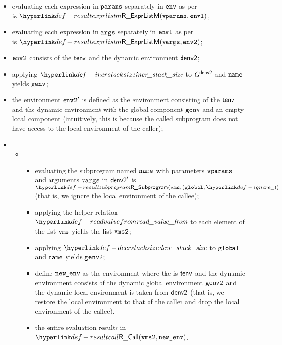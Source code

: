 \ProseParagraph
\AllApply
\begin{itemize}
  \item evaluating each expression in $\texttt{params}$ separately in $\texttt{env}$ as per\\
         is $\ResultExprListM(\vvparams, \envone)$\ProseOrAbnormal;
  \item evaluating each expression in $\texttt{args}$ separately in $\texttt{env1}$ as per \\
         is $\ResultExprListM(\vvargs, \envtwo)$\ProseOrAbnormal;
  \item $\texttt{env2}$ consists of the \staticenvironmentterm{} $\textsf{tenv}$ and the dynamic environment $\textsf{denv2}$;
  \item applying $\incrstacksize$ to $G^{\textsf{denv2}}$ and $\texttt{name}$ yields $\texttt{genv}$;
  \item the environment $\texttt{env2}'$ is defined as the environment
  consisting of the \staticenvironmentterm{} $\textsf{tenv}$ and the dynamic environment with the global component
  $\texttt{genv}$ and an empty local component (intuitively, this is because the called subprogram does not have access
  to the local environment of the caller);
  \item \OneApplies
  \begin{itemize}
    \item {}
    \begin{itemize}
      \item evaluating the subprogram named $\texttt{name}$ with parameters $\texttt{vparams}$ and arguments $\texttt{vargs}$ in
            $\textsf{denv2}'$ is $\ResultSubprogram(\vms, (\vglobal, \Ignore))$ (that is, we ignore the local environment
            of the callee)\ProseOrDynErrorDiverging;
      \item applying the helper relation $\readvaluefrom$ to each element of the list $\texttt{vms}$ yields the list $\texttt{vms2}$;
      \item applying $\decrstacksize$ to $\texttt{global}$ and $\texttt{name}$ yields $\texttt{genv2}$;
      \item define $\texttt{new\_env}$ as the environment where the \staticenvironmentterm{} is $\textsf{tenv}$ and the dynamic environment consists
            of the dynamic global environment $\texttt{genv2}$ and the dynamic local environment is taken from $\textsf{denv2}$
            (that is, we restore the local environment to that of the caller and drop the local environment of the callee).
      \item the entire evaluation results in $\ResultCall(\vmstwo, \newenv)$.
    \end{itemize}


\end{itemize}
\end{itemize}
